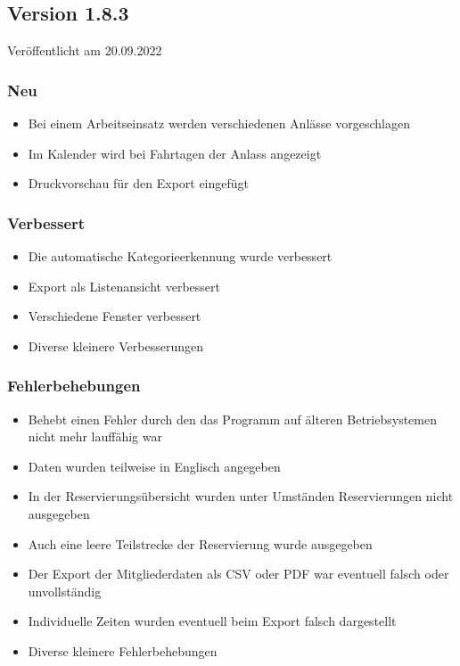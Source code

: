 \begin{neu}
\subsection{Version 1.8.3}
\label{version:1:8:3}
Veröffentlicht am 20.09.2022
\subsubsection{Neu}
\begin{itemize}
  \item
  Bei einem Arbeitseinsatz werden verschiedenen Anlässe vorgeschlagen
  \item
  Im Kalender wird bei Fahrtagen der Anlass angezeigt
  \item
  Druckvorschau für den Export eingefügt
\end{itemize}
\subsubsection{Verbessert}
\begin{itemize}
  \item
  Die automatische Kategorieerkennung wurde verbessert
  \item
  Export als Listenansicht verbessert
  \item
  Verschiedene Fenster verbessert
  \item
  Diverse kleinere Verbesserungen
\end{itemize}

\subsubsection{Fehlerbehebungen}
\begin{itemize}
  \item
  Behebt einen Fehler durch den das Programm auf älteren Betriebsystemen nicht mehr lauffähig war
  \item
  Daten wurden teilweise in Englisch angegeben
  \item
  In der Reservierungsübersicht wurden unter Umständen Reservierungen nicht ausgegeben
  \item
  Auch eine leere Teilstrecke der Reservierung wurde ausgegeben
  \item
  Der Export der Mitgliederdaten als CSV oder PDF war eventuell falsch oder unvollständig
  \item
  Individuelle Zeiten wurden eventuell beim Export falsch dargestellt
  \item
  Diverse kleinere Fehlerbehebungen
\end{itemize}


\end{neu}
